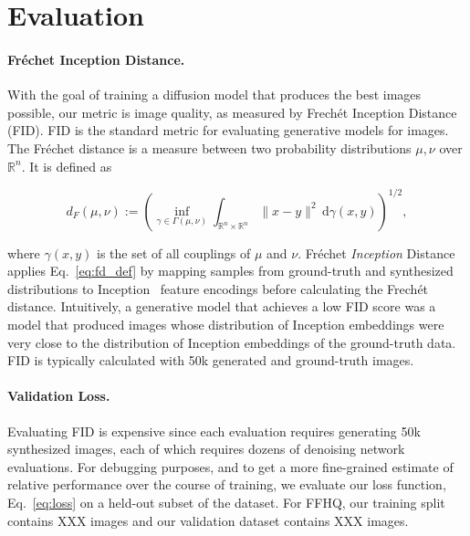 \section{Evaluation}

\paragraph{Fréchet Inception Distance.}
With the goal of training a diffusion model that produces the best images possible, our metric is image quality, as measured by Frechét Inception Distance (FID). FID is the standard metric for evaluating generative models for images. The Fréchet distance is a measure between two probability distributions $\mu, \nu$ over $\mathbb {R} ^{n}$. It is defined as

\begin{equation}
    d_{F}(\mu ,\nu ):=\left(\inf _{\gamma \in \Gamma (\mu ,\nu )}\int _{\mathbb {R} ^{n}\times \mathbb {R} ^{n}}\|x-y\|^{2}\,\mathrm {d} \gamma (x,y)\right)^{1/2}, \label{eq:fd_def}
\end{equation}

where $\gamma (x,y)$ is the set of all couplings of $\mu$ and $\nu$. Fréchet \emph{Inception} Distance applies Eq.~\ref{eq:fd_def} by mapping samples from ground-truth and synthesized distributions to Inception~\cite{?} feature encodings before calculating the Frechét distance. Intuitively, a generative model that achieves a low FID score was a model that produced images whose distribution of Inception embeddings were very close to the distribution of Inception embeddings of the ground-truth data. FID is typically calculated with 50k generated and ground-truth images.


\paragraph{Validation Loss.}

Evaluating FID is expensive since each evaluation requires generating 50k synthesized images, each of which requires dozens of denoising network evaluations. For debugging purposes, and to get a more fine-grained estimate of relative performance over the course of training, we evaluate our loss function, Eq.~\ref{eq:loss} on a held-out subset of the dataset. For FFHQ, our training split contains  XXX images and our validation dataset contains XXX images.